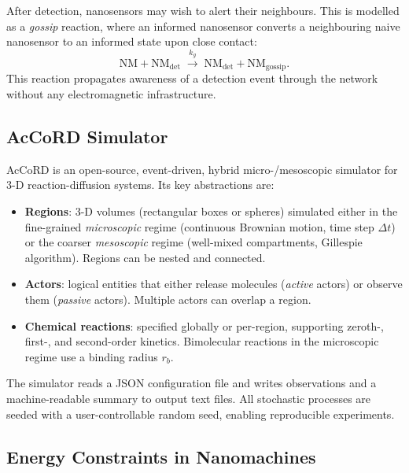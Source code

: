 \documentclass[journal]{IEEEtran}
\begin{document}
After detection, nanosensors may wish to alert their neighbours. This is modelled
as a \emph{gossip} reaction, where an informed nanosensor converts a neighbouring
naive nanosensor to an informed state upon close contact:
\begin{equation}
  \mathrm{NM} + \mathrm{NM}_\mathrm{det}
  \;\xrightarrow{k_g}\;
  \mathrm{NM}_\mathrm{det} + \mathrm{NM}_\mathrm{gossip}.
  \label{eq:gossip}
\end{equation}
This reaction propagates awareness of a detection event through the network
without any electromagnetic infrastructure.

\subsection{AcCoRD Simulator}

AcCoRD \cite{noel2017accord} is an open-source, event-driven, hybrid
micro-/mesoscopic simulator for 3-D reaction-diffusion systems. Its key
abstractions are:

\begin{itemize}
  \item \textbf{Regions}: 3-D volumes (rectangular boxes or spheres) simulated
        either in the fine-grained \emph{microscopic} regime (continuous Brownian
        motion, time step $\Delta t$) or the coarser \emph{mesoscopic} regime
        (well-mixed compartments, Gillespie algorithm). Regions can be nested
        and connected.
  \item \textbf{Actors}: logical entities that either release molecules
        (\emph{active} actors) or observe them (\emph{passive} actors). Multiple
        actors can overlap a region.
  \item \textbf{Chemical reactions}: specified globally or per-region, supporting
        zeroth-, first-, and second-order kinetics. Bimolecular reactions in the
        microscopic regime use a binding radius $r_b$.
\end{itemize}

The simulator reads a JSON configuration file and writes observations and a
machine-readable summary to output text files. All stochastic processes are
seeded with a user-controllable random seed, enabling reproducible experiments.

\subsection{Energy Constraints in Nanomachines}
\end{document}
